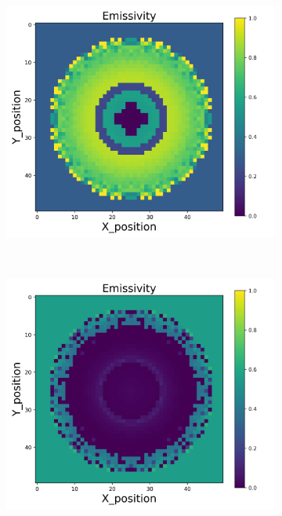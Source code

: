 \begin{figure}[p]
\begin{minipage}{\textwidth}
\begin{subfigure}{0.325\textwidth}
        \end{subfigure}
        \begin{subfigure}{0.325\textwidth}
            \centering
            \includegraphics[width=\textwidth]{figures/raw_data/31/linear/emi_cal.jpg}
        \end{subfigure}
    \end{minipage}\\
    \begin{minipage}{\textwidth}
        \centering
        \begin{subfigure}{0.325\textwidth}
            \centering
            \includegraphics[width=\textwidth]{figures/raw_data/32/linear/emi_cal.jpg}

\end{subfigure}
\end{minipage}
\end{figure}
